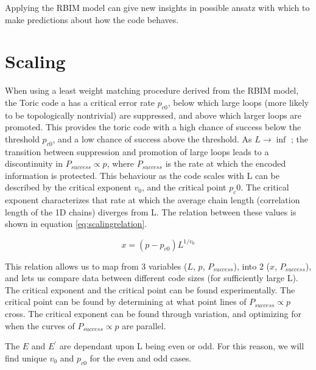 	Applying the RBIM model can give new insights in possible ansatz with which to make predictions about how the code behaves. 

\section{Scaling}
	When using a least weight matching procedure derived from the RBIM model, the Toric code a has a critical error rate $p_{c0}$, below which large loops (more likely to be topologically nontrivial) are suppressed, and above which larger loops are promoted. This provides the toric code with a high chance of success below the threshold $p_{c0}$, and a low chance of success above the threshold. As $L\rightarrow \inf$ ; the transition between suppression and promotion of large loops leads to a discontinuity in $P_{success} \propto p$, where $P_{success}$ is the rate at which the encoded information is protected. This behaviour as the code scales with L can be described by the critical exponent $v_0$, and the critical point $p_c0$. The critical exponent characterizes that rate at which the average chain length (correlation length of the 1D chains) diverges from L. The relation between these values is shown in equation \ref{eq:scalingrelation}.
	
	\begin{equation}
	 x = (p-p_{c0})L^{1/v_0} 
	 \label{eq:scalingrelation}
	\end{equation}

	This relation allows us to map from 3 variables ($L$, $p$, $P_{success}$), into 2 ($x$, $P_{success}$), and lets us compare data between different code sizes (for sufficiently large L). The critical exponent and the critical point can be found experimentally. The critical point can be found by determining at what point lines of $P_{success} \propto p$ cross. The critical exponent can be found through variation, and optimizing for when the curves of $P_{success} \propto p$ are parallel. 

	The $E$ and $E^\prime$ are dependant upon L being even or odd. For this reason, we will find unique $v_0$ and $p_{c0}$ for the even and odd cases.
